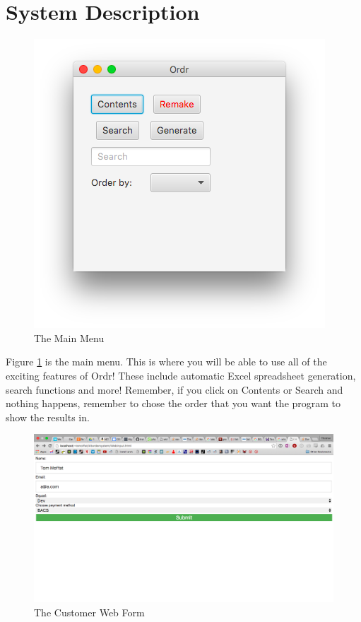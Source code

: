 \documentclass[11pt]{report}
\begin{document}
\section{System Description}
	\begin{figure}[H]
		\centering
		\includegraphics[scale=0.5]{MainMenu}
		\caption{The Main Menu}
		\label{mm}
	\end{figure}
	Figure \ref{mm} is the main menu. This is where you will be able to use all of the exciting features of Ordr! These include automatic Excel spreadsheet generation, search functions and more! Remember, if you click on Contents or Search and nothing happens, remember to chose the order that you want the program to show the results in.
	\begin{figure}[H]
		\centering
		\includegraphics[width=\textwidth]{CustomerForm}
		\caption{The Customer Web Form}
		\label{cf}
	\end{figure}
\end{document}
